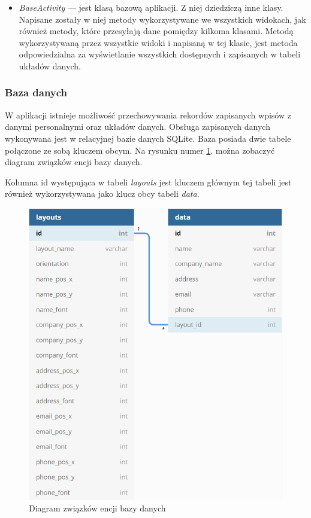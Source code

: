 \documentclass[a4paper,12pt, twoside]{article}
\begin{document}
\begin{itemize}
    	    \item \textit{BaseActivity} — jest klasą bazową aplikacji. Z niej dziedziczą inne klasy. Napisane zostały w niej metody wykorzystywane we wszystkich widokach, jak również metody, które przesyłają dane pomiędzy kilkoma klasami. Metodą wykorzystywaną przez wszystkie widoki i napisaną w tej klasie, jest metoda odpowiedzialna za wyświetlanie wszystkich dostępnych i zapisanych w tabeli układów danych.
    	\end{itemize}
    
        \subsubsection{Baza danych}
        W aplikacji istnieje możliwość przechowywania rekordów zapisanych wpisów z danymi personalnymi oraz układów danych. Obsługa zapisanych danych wykonywana jest w relacyjnej bazie danych SQLite. Baza posiada dwie tabele połączone ze sobą kluczem obcym. Na rysunku numer \ref{fig:database}. można zobaczyć diagram związków encji bazy danych. 
        
        Kolumna id występująca w tabeli \textit{layouts} jest kluczem głównym tej tabeli jest również wykorzystywana jako klucz obcy tabeli \textit{data}. 
        
        \begin{figure}[H]
    	        \centering
    			\includegraphics[width=12cm]{images/rys_11baza.png}
    			\caption{Diagram związków encji bazy danych}
                \label{fig:database}
    	\end{figure}
    	
\end{document}
